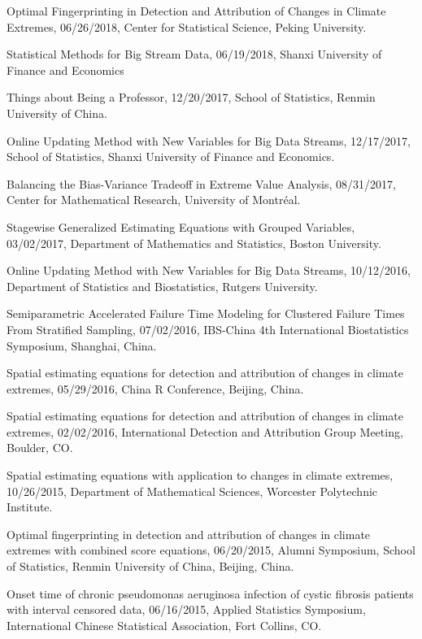 \documentclass[Statistics]{vita}
\begin{document}
\begin{vita}
\begin{InvitedTalksLectures}
\begin{InvitedTalks}
  \item Optimal Fingerprinting in Detection and Attribution of Changes in Climate Extremes, 06/26/2018, Center for Statistical Science, Peking University.
  \item Statistical Methods for Big Stream Data, 06/19/2018, Shanxi University of Finance and Economics
  \item Things about Being a Professor, 12/20/2017, School of Statistics, Renmin University of China.
  \item Online Updating Method with New Variables for Big Data Streams, 12/17/2017, School of Statistics, Shanxi University of Finance and Economics.
  \item Balancing the Bias-Variance Tradeoff in Extreme Value Analysis, 08/31/2017, Center for Mathematical Research, University of Montr\'eal.
  \item Stagewise Generalized Estimating Equations with Grouped Variables, 03/02/2017, Department of Mathematics and Statistics, Boston University.
  \item Online Updating Method with New Variables for Big Data Streams, 10/12/2016, Department of Statistics and Biostatistics, Rutgers University.
  \item Semiparametric Accelerated Failure Time Modeling for Clustered Failure Times From Stratified Sampling, 07/02/2016, IBS-China 4th International Biostatistics Symposium, Shanghai, China.
  \item Spatial estimating equations for detection and attribution of changes in climate extremes, 05/29/2016, China R Conference, Beijing, China.
  \item Spatial estimating equations for detection and attribution of changes in climate extremes, 02/02/2016, International Detection and Attribution Group Meeting, Boulder, CO\@.
  \item Spatial estimating equations with application to changes in climate extremes, 10/26/2015, Department of Mathematical Sciences, Worcester Polytechnic Institute.
  \item Optimal fingerprinting in detection and attribution of changes in climate extremes with combined score equations, 06/20/2015, Alumni Symposium, School of Statistics, Renmin University of China, Beijing, China.
  \item Onset time of chronic pseudomonas aeruginosa infection of cystic fibrosis patients with interval censored data, 06/16/2015, Applied Statistics Symposium, International Chinese Statistical Association, Fort Collins, CO\@.

\end{InvitedTalks}
\end{InvitedTalksLectures}
\end{vita}
\end{document}
